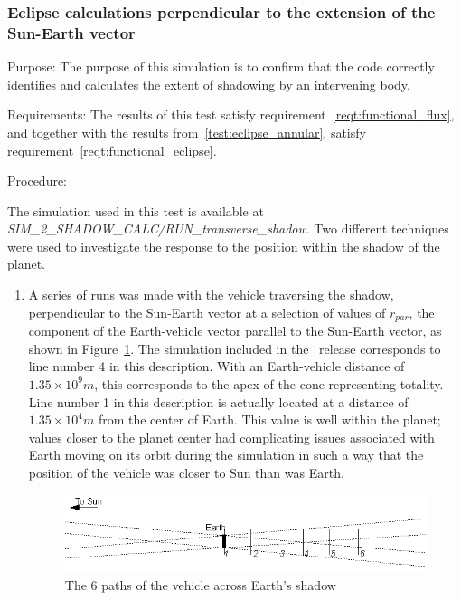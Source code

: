   \subsubsection{Eclipse calculations perpendicular to the extension of the
     Sun-Earth vector}
  \label{test:eclipse_transverse}
  \begin{description}
    \item{Purpose:}\newline
      The purpose of this simulation is to confirm that the code
      correctly identifies and calculates the extent of shadowing by an
      intervening body.
    \item{Requirements:}\newline
        The results of this test satisfy
        requirement~\ref{reqt:functional_flux}, and together with the results
        from~\ref{test:eclipse_annular}, satisfy
        requirement~\ref{reqt:functional_eclipse}.
    \item{Procedure:}\newline

The simulation used in this test is available at \textit{SIM\_2\_SHADOW\_CALC/RUN\_transverse\_shadow}.
      Two different techniques were used to investigate the
      response to the position within the shadow of the planet.
      \begin{enumerate}
        \item{}
        A series of runs was made with the vehicle traversing the shadow,
        perpendicular to the Sun{}-Earth vector at a selection of values of
        $r_{\mathit{par}}$, the component of the Earth-vehicle vector parallel to
        the Sun-Earth vector, as shown in
        Figure~\ref{fig:ivv_transverse_eclipse_layout}.
        The simulation included in the \JEODid\ release corresponds to line number 4 in this description.  With an Earth-vehicle distance of $1.35 \times 10^9 m$, this corresponds to the apex of the cone representing totality.  Line number 1 in this description is actually located at a distance of $1.35 \times 10^4 m$ from the center of Earth.  This value is well within the planet; values closer to the planet center had complicating issues associated with Earth moving on its orbit during the simulation in such a way that the position of the vehicle was closer to Sun than was Earth.
        \begin{figure}[!ht]
          \includegraphics[width=180mm]{figs/eclipse/drawings1_te.jpg}
          \caption{The 6 paths of the vehicle across Earth's shadow}
          \label{fig:ivv_transverse_eclipse_layout}
        \end{figure}


\end{enumerate}
\end{description}
